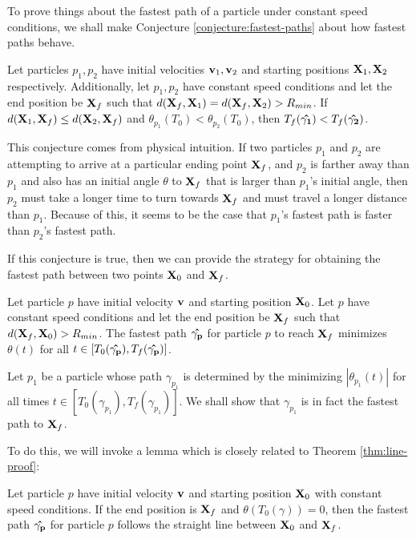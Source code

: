 To prove things about the fastest path of a particle under constant speed conditions, we shall make Conjecture \ref{conjecture:fastest-paths} about how fastest paths behave.

\begin{conjecture}
  \label{conjecture:fastest-paths}
  Let particles $p_1, p_2$ have initial velocities $\mathbf{v}_1, \mathbf{v}_2$ and starting positions $\mathbf{X}_1, \mathbf{X}_2$ respectively. Additionally, let $p_1, p_2$ have constant speed conditions and let the end position be $\mathbf{X}_f$ such that $d(\mathbf{X}_f, \mathbf{X}_1) = d(\mathbf{X}_f, \mathbf{X}_2) > R_{min}$. If $d(\mathbf{X}_1, \mathbf{X}_f) \leq d(\mathbf{X}_2, \mathbf{X}_f)$ and $\theta_{p_1}(T_0) < \theta_{p_2}(T_0)$, then $T_f(\mathbf{\hat{\gamma_1}}) < T_f(\mathbf{\hat{\gamma_2}})$.
\end{conjecture}

This conjecture comes from physical intuition. If two particles $p_1$ and $p_2$ are attempting to arrive at a particular ending point $\mathbf{X}_f$, and $p_2$ is farther away than $p_1$ and also has an initial angle $\theta$ to $\mathbf{X}_f$ that is larger than $p_1$'s initial angle, then $p_2$ must take a longer time to turn towards $\mathbf{X}_f$ and must travel a longer distance than $p_1$. Because of this, it seems to be the case that $p_1$'s fastest path is faster than $p_2$'s fastest path.

If this conjecture is true, then we can provide the strategy for obtaining the fastest path between two points $\mathbf{X}_0$ and $\mathbf{X}_f$.

\begin{theorem}
  Let particle $p$ have initial velocity $\mathbf{v}$ and starting position $\mathbf{X}_0$. Let $p$ have constant speed conditions and let the end position be $\mathbf{X}_f$ such that $d(\mathbf{X}_f, \mathbf{X}_0) > R_{min}$. The fastest path $\mathbf{\hat{\gamma_p}}$ for particle $p$ to reach $\mathbf{X}_f$ minimizes $\theta(t)$ for all $t \in [T_0(\mathbf{\hat{\gamma_p}}), T_f(\mathbf{\hat{\gamma_p}})]$.
  \label{thm:restricted-theta}
\end{theorem}
\proof Let $p_1$ be a particle whose path $\gamma_{p_1}$ is determined by the minimizing $|\theta_{p_1}(t)|$ for all times $t \in [T_0(\gamma_{p_1}), T_f(\gamma_{p_1})]$. We shall show that $\gamma_{p_1}$ is in fact the fastest path to $\mathbf{X}_f$.

To do this, we will invoke a lemma which is closely related to Theorem \ref{thm:line-proof}:

\begin{lemma}
  Let particle $p$ have initial velocity $\mathbf{v}$ and starting position $\mathbf{X}_0$ with constant speed conditions. If the end position is $\mathbf{X}_f$ and $\theta(T_0(\gamma)) = 0$, then the fastest path $\mathbf{\hat{\gamma_p}}$ for particle $p$ follows the straight line between $\mathbf{X}_0$ and $\mathbf{X}_f$.
\end{lemma}

